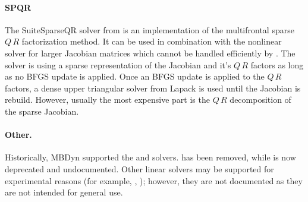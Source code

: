 \paragraph{SPQR}
The SuiteSparseQR solver  from \cite{SUITESPARSE-QR-2011} is an implementation
of the multifrontal sparse $Q\,R$ factorization method. It can be used in combination
with the  nonlinear solver for larger Jacobian matrices which cannot be
handled efficiently by . The  solver is using a sparse representation
of the Jacobian and it's $Q\,R$ factors as long as no BFGS update is applied.
Once an BFGS update is applied to the $Q\,R$ factors, a dense upper triangular solver
from Lapack is used until the Jacobian is rebuild. However, usually the most expensive
part is the $Q\,R$ decomposition of the sparse Jacobian.

\begin{comment}
Another linear solver, that is available mostly for historical reasons, 
is \kw{harwell}, with a \nt{workspace\_size}
of $ \nt{numdofs}\times\nt{numdofs} $, but in certain cases the user
might prefer a smaller workspace, since the matrix is handled as sparse,
while sometimes a larger space is required, since when the matrix is
full, a little more space is required, due to extra storage needs when
the matrix fills up.
\end{comment}

\paragraph{Other.}
Historically, MBDyn supported the  and  solvers.
 has been removed, while 
is now deprecated and undocumented.
Other linear solvers may be supported for experimental reasons
(for example, , );
however, they are not documented as they are not intended for general use.

